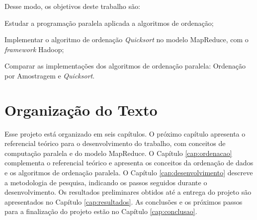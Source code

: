 Desse modo, os objetivos deste trabalho são:

\begin{packed_enum}
\item Estudar a programação paralela aplicada a algoritmos de ordenação;
\item Implementar o algoritmo de ordenação  \textit{Quicksort} no modelo MapReduce, com o \textit{framework} Hadoop;
\item Comparar as implementações dos algoritmos de ordenação paralela: Ordenação por Amostragem e \textit{Quicksort}.
\end{packed_enum}


\section{Organização do Texto}

Esse projeto está organizado em seis capítulos. O próximo capítulo apresenta o referencial teórico para o desenvolvimento do trabalho, com conceitos de computação paralela  e do modelo MapReduce.
O Capítulo \ref{cap:ordenacao} complementa o referencial teórico e apresenta os conceitos da ordenação de dados e os algoritmos de ordenação paralela.
O Capítulo \ref{cap:desenvolvimento} descreve a metodologia de pesquisa, indicando os passos seguidos durante o desenvolvimento. Os resultados preliminares obtidos até a entrega do projeto são apresentados no Capítulo \ref{cap:resultados}. As conclusões e os próximos passos para a finalização do projeto estão no Capítulo \ref{cap:conclusao}.




